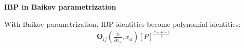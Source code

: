 \documentclass[10pt]{article}
\begin{document}
\textbf{IBP in Baikov parametrization}

With Baikov parametrization, IBP identities become polynomial identities:
\begin{eqnarray}
\mathbf{O}_{ij}\left(\frac{\partial}{\partial x_a}, x_a \right) \left[P \right]^{\frac{d-M-1}{2}}
\end{eqnarray}
\end{document}
